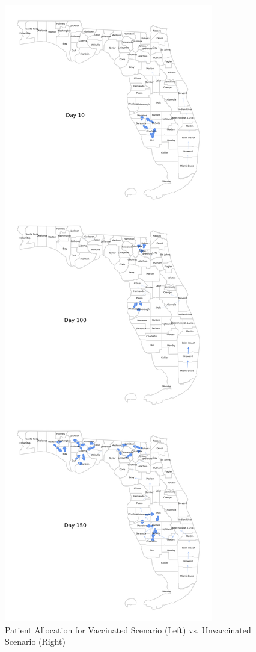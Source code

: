 \documentclass{article}
\begin{document}
\begin{figure}
    \includegraphics[width=0.43\linewidth]{pics/paperStackedPatientTransfersNoVax.png}
    \caption{Patient Allocation for Vaccinated Scenario (Left) vs. Unvaccinated Scenario (Right)}
    \label{fig:patientAlloc}
\end{figure}
\end{document}
